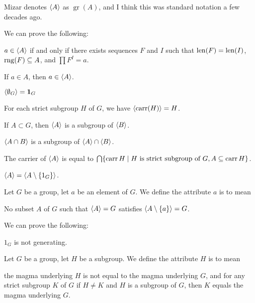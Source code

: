 \documentclass{article}
\begin{document}
\begin{remark}
Mizar denotes $\langle A\rangle$ as $\operatorname{gr}(A)$, and I think this was
standard notation a few decades ago.
\end{remark}

We can prove the following:
\begin{thm}
\item\label{group4:28} $a\in\langle A\rangle$ if and only if there exists
  sequences $F$ and $I$ such that $\operatorname{len}(F)=\operatorname{len}(I)$, $\operatorname{rng}(F)\subseteq A$,
  and $\prod F^{I}=a$.
\item\label{group4:29} If $a\in A$, then $a\in\langle A\rangle$.
\item\label{group4:30} $\langle\emptyset_{G}\rangle=\mathbf{1}_{G}$
\item\label{group4:31} For each strict subgroup $H$ of $G$, we have $\langle\operatorname{carr}(H)\rangle=H$.
\item\label{group4:32} If $A\subset G$, then $\langle A\rangle$ is a subgroup of $\langle B\rangle$.
\item\label{group4:33} $\langle A\cap B\rangle$ is a subgroup of $\langle A\rangle\cap\langle B\rangle$.
\item\label{group4:34} The carrier of $\langle A\rangle$ is equal to
  $\bigcap\{\operatorname{carr}{H}\mid H\mbox{ is strict subgroup of }G, A\subseteq\operatorname{carr}{H}\}$.
\item\label{group4:35} $\langle A\rangle=\langle A\setminus\{1_{G}\}\rangle$.
\end{thm}

\begin{definition}
Let $G$ be a group, let $a$ be an element of $G$.
We define the attribute $a$ is  to mean
\begin{defn}
\item No subset $A$ of $G$ such that $\langle A\rangle=G$ satisfies $\langle A\setminus\{a\}\rangle=G$.
\end{defn}
\end{definition}

We can prove the following:
\begin{thm}
\item\label{group4:36} $1_{G}$ is not generating.
\end{thm}

\begin{definition}
Let $G$ be a group, let $H$ be a subgroup.
We define the attribute $H$ is  to mean
\begin{defn}
\item the magma underlying $H$ is not equal to the magma underlying $G$,
  and for any strict subgroup $K$ of $G$ if $H\neq K$ and $H$ is a
  subgroup of $G$, then $K$ equals the magma underlying $G$.
\end{defn}
\end{definition}
\end{document}
